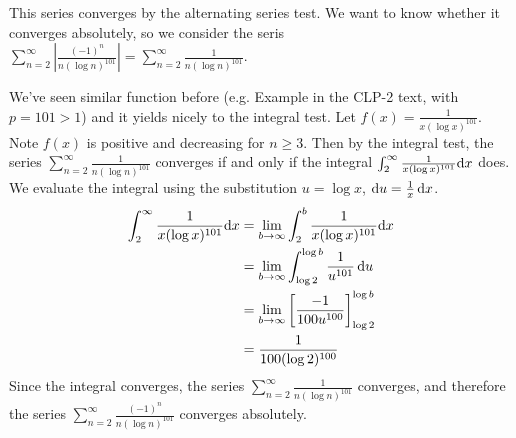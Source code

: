 \begin{solution}
This series converges by the alternating series test. We want to know whether it converges absolutely, so we consider the seris$\displaystyle\sum_{n=2}^\infty\left|\frac{(-1)^n}{n(\log n)^{101}}\right|=\sum_{n=2}^\infty\frac{1}{n(\log n)^{101}}$.

We've seen similar function before (e.g. Example  in the CLP-2 text, with $p=101>1$) and it yields nicely to the integral test. Let $f(x) = \frac{1}{x(\log x)^{101}}$. Note $f(x)$ is positive and decreasing for $n \ge 3$. Then by the integral test, the series
$\sum_{n=2}^\infty\frac{1}{n(\log n)^{101}}$ converges if and only if the integral
$\int_2^\infty \frac{1}{x(\log x)^{101}}\mathrm{d}x$ does. We evaluate the integral using the substitution $u=\log x$, $\mathrm{d}u=\frac{1}{x}\,\mathrm{d}x$.
\begin{align*}
\int_2^\infty \frac{1}{x(\log x)^{101}}\mathrm{d}x&=\lim_{b \to \infty}\int_2^b \frac{1}{x(\log x)^{101}}\mathrm{d}x\\
&=\lim_{b \to \infty}\int_{\log 2}^{\log b}\frac{1}{u^{101}}\,\mathrm{d}u\\
&=\lim_{b \to \infty}\left[\frac{-1}{100 u^{100}}\right]_{\log 2}^{\log b}\\
&=\frac{1}{100(\log 2)^{100}}
\end{align*}
Since the integral converges, the series
$\sum\limits_{n=2}^\infty\frac{1}{n(\log n)^{101}}$ converges, and therefore the series
$\sum\limits_{n=2}^\infty\frac{(-1)^n}{n(\log n)^{101}}$ converges absolutely.
\end{solution}

